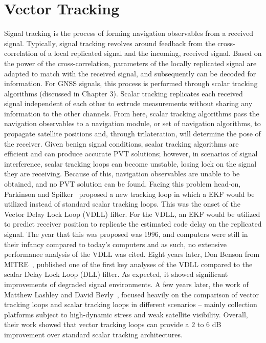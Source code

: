 \section{\textbf{Vector Tracking}}
Signal tracking is the process of forming navigation observables from a received signal. Typically, signal tracking revolves around feedback from the cross-correlation of a local replicated signal and the incoming, received signal. Based on the power of the cross-correlation, parameters of the locally replicated signal are adapted to match with the received signal, and subsequently can be decoded for information. For GNSS signals, this process is performed through scalar tracking algorithms (discussed in Chapter 3). Scalar tracking replicates each received signal independent of each other to extrude measurements without sharing any information to the other channels. From here, scalar tracking algorithms pass the navigation observables to a navigation module, or set of navigation algorithms, to propagate satellite positions and, through trilateration, will determine the pose of the receiver. Given benign signal conditions, scalar tracking algorithms are efficient and can produce accurate PVT solutions; however, in scenarios of signal interference, scalar tracking loops can become unstable, losing lock on the signal they are receiving. Because of this, navigation observables are unable to be obtained, and no PVT solution can be found.
Facing this problem head-on, Parkinson and Spilker~\cite{bradfordparkinsonGlobalPositioningSystem1996} proposed a new tracking loop in which a EKF would be utilized instead of standard scalar tracking loops. This was the onset of the Vector Delay Lock Loop (VDLL) filter. For the VDLL, an EKF would be utilized to predict receiver position to replicate the estimated code delay on the replicated signal. The year that this was proposed was 1996, and computers were still in their infancy compared to today's computers and as such, no extensive performance analysis of the VDLL was cited.
Eight years later, Don Benson from MITRE~\cite{bensonInterferenceBenefitsVector}, published one of the first key analyses of the VDLL compared to the scalar Delay Lock Loop (DLL) filter. As expected, it showed significant improvements of degraded signal environments. A few years later, the work of Matthew Lashley and David Bevly~\cite{lashleyPerformanceAnalysisVector2009,edwardsImplementationDetailsDeeply2010,matthewlashelyModelingPerformanceAnalysis2009}, focused heavily on the comparison of vector tracking loops and scalar tracking loops in different scenarios {--} mainly collection platforms subject to high-dynamic stress and weak satellite visibility. Overall, their work showed that vector tracking loops can provide a \(2\) to \(6\) dB improvement over standard scalar tracking architectures.
